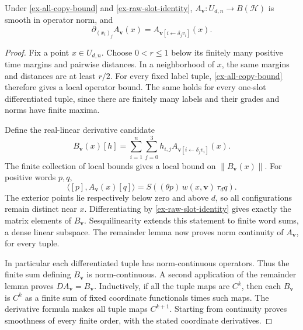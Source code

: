 \begin{proposition}\label{ex-smooth-slabs}
Under \eqref{ex-all-copy-bound} and \eqref{ex-raw-slot-identity},
\(A_{\boldsymbol v}:U_{d,n}\to B(\mathcal H)\) is smooth in operator
norm, and
\[
 \partial_{(x_i)_j}A_{\boldsymbol v}(x)
 =A_{\boldsymbol v[i\leftarrow\delta_jv_i]}(x).
\]
\end{proposition}
\begin{proof}
Fix a point \(x\in U_{d,n}\). Choose \(0<r\le1\) below its finitely
many positive time margins and pairwise distances. In a neighborhood of
\(x\), the same margins and distances are at least \(r/2\).
For every fixed label tuple, \eqref{ex-all-copy-bound} therefore gives
a local operator bound. The same holds for every one-slot differentiated
tuple, since there are finitely many labels and their grades and norms
have finite maxima.

Define the real-linear derivative candidate
\[
 B_{\boldsymbol v}(x)[h]
 =\sum_{i=1}^n\sum_{j=0}^3h_{i,j}
    A_{\boldsymbol v[i\leftarrow\delta_jv_i]}(x).
\]
The finite collection of local bounds gives a local bound on
\(\|B_{\boldsymbol v}(x)\|\). For positive words \(p,q\),
\[
 \langle[p],A_{\boldsymbol v}(x)[q]\rangle
 =S((\theta p)\,w(x,\boldsymbol v)\,\tau_dq).
\]
The exterior points lie respectively below zero and above \(d\), so
all configurations remain distinct near \(x\). Differentiating by
\eqref{ex-raw-slot-identity} gives exactly the matrix elements of
\(B_{\boldsymbol v}\). Sesquilinearity extends this statement to
finite word sums, a dense linear subspace. The remainder lemma now
proves norm continuity of \(A_{\boldsymbol v}\), for every tuple.

In particular each differentiated tuple has norm-continuous operators.
Thus the finite sum defining \(B_{\boldsymbol v}\) is norm-continuous.
A second application of the remainder lemma proves
\(DA_{\boldsymbol v}=B_{\boldsymbol v}\). Inductively, if all the
tuple maps are \(C^k\), then each \(B_{\boldsymbol v}\) is \(C^k\)
as a finite sum of fixed coordinate functionals times such maps. The
derivative formula makes all tuple maps \(C^{k+1}\). Starting from
continuity proves smoothness of every finite order, with the stated
coordinate derivatives.
\end{proof}

